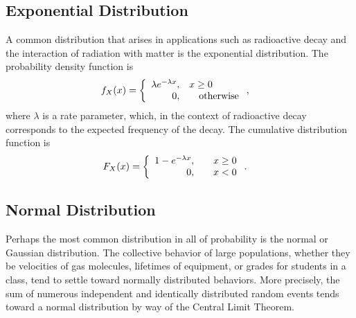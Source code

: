 \subsection{Exponential Distribution}

A common distribution that arises in applications such as radioactive decay and the interaction of radiation with matter is the exponential distribution. The probability density function is
\begin{align}
  f_X(x) &= \left\{ \begin{array}{r l}
  \lambda e^{-\lambda x}, & x \ge 0 \\
  0, & \quad \text{otherwise} \\ \end{array} \right. ,
\end{align}
where $\lambda$ is a rate parameter, which, in the context of radioactive decay corresponds to the expected frequency of the decay. The cumulative distribution function is
\begin{align}
  F_X(x) &= \left\{ \begin{array}{r l}
  1 - e^{-\lambda x}, & \quad x \ge 0 \\ 
  0,                  & \quad x < 0 \\ \end{array} \right. .
\end{align}


\subsection{Normal Distribution}

Perhaps the most common distribution in all of probability is the normal or Gaussian distribution. The collective behavior of large populations, whether they be velocities of gas molecules, lifetimes of equipment, or grades for students in a class, tend to settle toward normally distributed behaviors. More precisely, the sum of numerous independent and identically distributed random events tends toward a normal distribution by way of the Central Limit Theorem.

